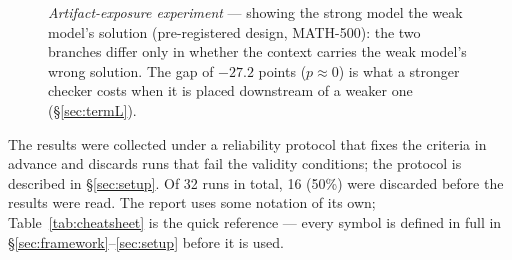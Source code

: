 \documentclass[11pt,a4paper]{article}
\begin{document}
\begin{figure}[!ht]\centering
{}
\caption{\emph{Artifact-exposure experiment} --- showing the strong model the weak model's solution
(pre-registered design, MATH-500): the two branches differ only in whether the context carries
the weak model's wrong solution. The gap of $-27.2$ points ($p \approx 0$) is what a stronger
checker costs when it is placed downstream of a weaker one (\S\ref{sec:termL}).}
\label{fig:exposure}
\end{figure}

The results were collected under a reliability protocol that fixes the criteria in advance and discards runs that
fail the validity conditions; the protocol is described in
\S\ref{sec:setup}. Of 32 runs in total, 16 (50\%) were discarded before the results were read. The report uses some notation of its own; Table~\ref{tab:cheatsheet} is the quick reference ---
every symbol is defined in full in \S\ref{sec:framework}--\ref{sec:setup} before it is
used.
\end{document}
